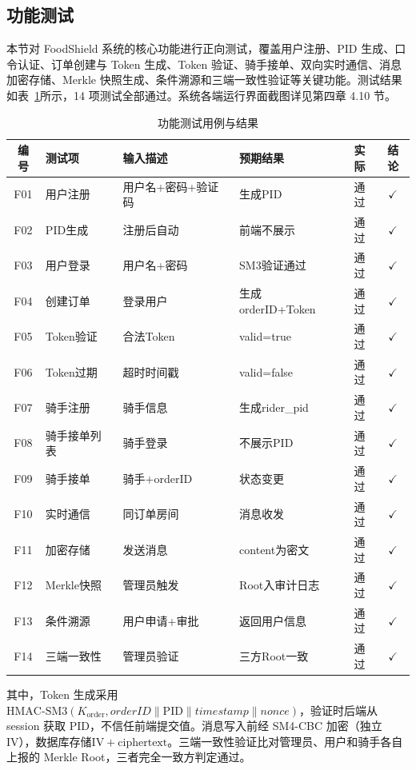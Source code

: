 \subsection{功能测试}

本节对 FoodShield 系统的核心功能进行正向测试，覆盖用户注册、PID 生成、口令认证、订单创建与 Token 生成、Token 验证、骑手接单、双向实时通信、消息加密存储、Merkle 快照生成、条件溯源和三端一致性验证等关键功能。测试结果如表~\ref{tab:func_test}所示，14 项测试全部通过。系统各端运行界面截图详见第四章 4.10 节。

\begin{table}[H]
\centering
\caption{功能测试用例与结果}
\label{tab:func_test}
\footnotesize
\setlength{\tabcolsep}{4pt}
\begin{tabular}{clllcc}
\hline
\textbf{编号} & \textbf{测试项} & \textbf{输入描述} & \textbf{预期结果} & \textbf{实际} & \textbf{结论} \\
\hline
F01 & 用户注册 & 用户名+密码+验证码 & 生成PID & 通过 & $\checkmark$ \\
F02 & PID生成 & 注册后自动 & 前端不展示 & 通过 & $\checkmark$ \\
F03 & 用户登录 & 用户名+密码 & SM3验证通过 & 通过 & $\checkmark$ \\
F04 & 创建订单 & 登录用户 & 生成orderID+Token & 通过 & $\checkmark$ \\
F05 & Token验证 & 合法Token & valid=true & 通过 & $\checkmark$ \\
F06 & Token过期 & 超时时间戳 & valid=false & 通过 & $\checkmark$ \\
F07 & 骑手注册 & 骑手信息 & 生成rider\_pid & 通过 & $\checkmark$ \\
F08 & 骑手接单列表 & 骑手登录 & 不展示PID & 通过 & $\checkmark$ \\
F09 & 骑手接单 & 骑手+orderID & 状态变更 & 通过 & $\checkmark$ \\
F10 & 实时通信 & 同订单房间 & 消息收发 & 通过 & $\checkmark$ \\
F11 & 加密存储 & 发送消息 & content为密文 & 通过 & $\checkmark$ \\
F12 & Merkle快照 & 管理员触发 & Root入审计日志 & 通过 & $\checkmark$ \\
F13 & 条件溯源 & 用户申请+审批 & 返回用户信息 & 通过 & $\checkmark$ \\
F14 & 三端一致性 & 管理员验证 & 三方Root一致 & 通过 & $\checkmark$ \\
\hline
\end{tabular}
\end{table}

其中，Token 生成采用$\mathrm{HMAC\text{-}SM3}(K_{\mathrm{order}}, \mathit{orderID} \| \mathrm{PID} \| \mathit{timestamp} \| \mathit{nonce})$，验证时后端从 session 获取 PID，不信任前端提交值。消息写入前经 SM4-CBC 加密（独立 IV），数据库存储$\mathrm{IV}+\mathrm{ciphertext}$。三端一致性验证比对管理员、用户和骑手各自上报的 Merkle Root，三者完全一致方判定通过。
